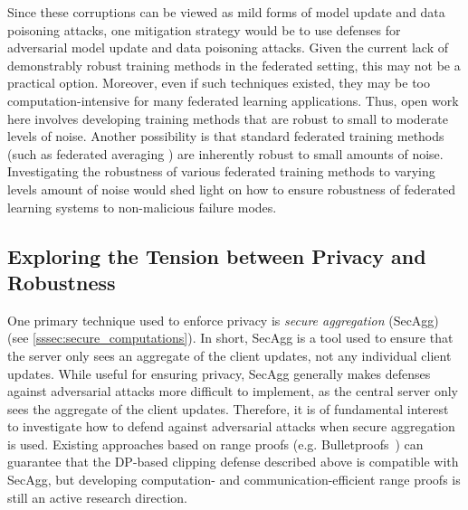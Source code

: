 Since these corruptions can be viewed as mild forms of model update and data poisoning attacks, one mitigation strategy would be to use defenses for adversarial model update and data poisoning attacks. Given the current lack of demonstrably robust training methods in the federated setting, this may not be a practical option. Moreover, even if such techniques existed, they may be too computation-intensive for many federated learning applications. Thus, open work here involves developing training methods that are robust to small to moderate levels of noise. Another possibility is that standard federated training methods (such as federated averaging \citep{mcmahan17fedavg}) are inherently robust to small amounts of noise. Investigating the robustness of various federated training methods to varying levels amount of noise would shed light on how to ensure robustness of federated learning systems to non-malicious failure modes.


\subsection{Exploring the Tension between Privacy and Robustness}
\label{subsec:tension_privacy_robustness}


One primary technique used to enforce privacy is \emph{secure aggregation} (SecAgg) (see \ref{sssec:secure_computations}). In short, SecAgg is a tool used to ensure that the server only sees an aggregate of the client updates, not any individual client updates. While useful for ensuring privacy, SecAgg generally makes defenses against adversarial attacks more difficult to implement, as the central server only sees the aggregate of the client updates. Therefore, it is of fundamental interest to investigate how to defend against adversarial attacks when secure aggregation is used. Existing approaches based on range proofs (e.g. Bulletproofs~\citep{DBLP:conf/sp/BunzBBPWM18}) can guarantee that the DP-based clipping defense described above is compatible with SecAgg, but developing computation- and communication-efficient range proofs is still an active research direction.


